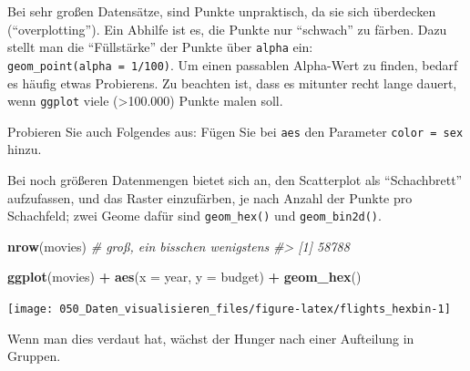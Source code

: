 \documentclass[12pt,ngerman,]{book}
\makeatletter
\newenvironment{Shaded}{\begin{snugshade}}{\end{snugshade}}
\newcommand{\KeywordTok}[1]{\textcolor[rgb]{0.13,0.29,0.53}{\textbf{#1}}}
\newcommand{\DataTypeTok}[1]{\textcolor[rgb]{0.13,0.29,0.53}{#1}}
\newcommand{\DecValTok}[1]{\textcolor[rgb]{0.00,0.00,0.81}{#1}}
\newcommand{\StringTok}[1]{\textcolor[rgb]{0.31,0.60,0.02}{#1}}
\newcommand{\CommentTok}[1]{\textcolor[rgb]{0.56,0.35,0.01}{\textit{#1}}}
\newcommand{\OperatorTok}[1]{\textcolor[rgb]{0.81,0.36,0.00}{\textbf{#1}}}
\newcommand{\NormalTok}[1]{#1}
\newenvironment{kframe}{%
\medskip{}
\setlength{\fboxsep}{.8em}
 \def\at@end@of@kframe{}%
 \ifinner\ifhmode%
  \def\at@end@of@kframe{\end{minipage}}%
  \begin{minipage}{\columnwidth}%
 \fi\fi%
 \def\FrameCommand##1{\hskip\@totalleftmargin \hskip-\fboxsep
 \colorbox{shadecolor}{##1}\hskip-\fboxsep
     \hskip-\linewidth \hskip-\@totalleftmargin \hskip\columnwidth}%
 \MakeFramed {\advance\hsize-\width
   \@totalleftmargin\z@ \linewidth\hsize
   \@setminipage}}%
 {\par\unskip\endMakeFramed%
 \at@end@of@kframe}
\renewenvironment{Shaded}{\begin{kframe}}{\end{kframe}}
\theoremstyle{definition}
\theoremstyle{definition}
\theoremstyle{remark}
\makeatother
\begin{document}
Bei sehr großen Datensätze, sind Punkte unpraktisch, da sie sich
überdecken (``overplotting''). Ein Abhilfe ist es, die Punkte nur
``schwach'' zu färben. Dazu stellt man die ``Füllstärke'' der Punkte
über \texttt{alpha} ein: \texttt{geom\_point(alpha\ =\ 1/100)}. Um einen
passablen Alpha-Wert zu finden, bedarf es häufig etwas Probierens. Zu
beachten ist, dass es mitunter recht lange dauert, wenn \texttt{ggplot}
viele (\textgreater{}100.000) Punkte malen soll.

Probieren Sie auch Folgendes aus: Fügen Sie bei \texttt{aes} den
Parameter \texttt{color\ =\ sex} hinzu.

Bei noch größeren Datenmengen bietet sich an, den Scatterplot als
``Schachbrett'' aufzufassen, und das Raster einzufärben, je nach Anzahl
der Punkte pro Schachfeld; zwei Geome dafür sind \texttt{geom\_hex()}
und \texttt{geom\_bin2d()}.

\begin{Shaded}
\begin{Highlighting}[]
\KeywordTok{nrow}\NormalTok{(movies)  }\CommentTok{# groß, ein bisschen wenigstens}
\CommentTok{#> [1] 58788}

\KeywordTok{ggplot}\NormalTok{(movies) }\OperatorTok{+}
\StringTok{  }\KeywordTok{aes}\NormalTok{(}\DataTypeTok{x =}\NormalTok{ year, }\DataTypeTok{y =}\NormalTok{ budget) }\OperatorTok{+}
\StringTok{  }\KeywordTok{geom_hex}\NormalTok{()}
\end{Highlighting}
\end{Shaded}

\begin{center}\texttt{[image: 050\_Daten\_visualisieren\_files/figure-latex/flights\_hexbin-1]} \end{center}

Wenn man dies verdaut hat, wächst der Hunger nach einer Aufteilung in
Gruppen.

\begin{Shaded}
\end{Shaded}
\end{document}
